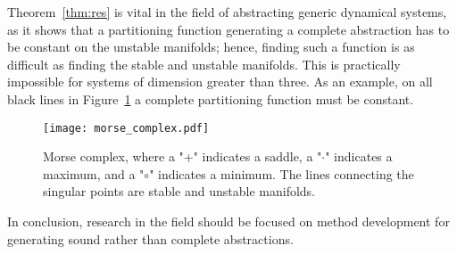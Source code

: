 Theorem~\ref{thm:res} is vital in the field of abstracting generic dynamical systems, as it shows that a partitioning function generating a complete abstraction has to be constant on the unstable manifolds; hence, finding such a function is as difficult as finding the stable and unstable manifolds. This is practically impossible for systems of dimension greater than three. As an example, on all black lines in Figure~\ref{fig:morse_complex} a complete partitioning function must be constant.
\begin{figure}[!htb]
    \centering
       \texttt{[image: morse\_complex.pdf]}
    \caption{Morse complex, where a "+" indicates a saddle, a "$\cdot$" indicates a maximum, and a "$\circ$" indicates a minimum. The lines connecting the singular points are stable and unstable manifolds.\label{fig:morse_complex}}
\end{figure}
In conclusion, research in the field should be focused on method development for generating sound rather than complete abstractions.
